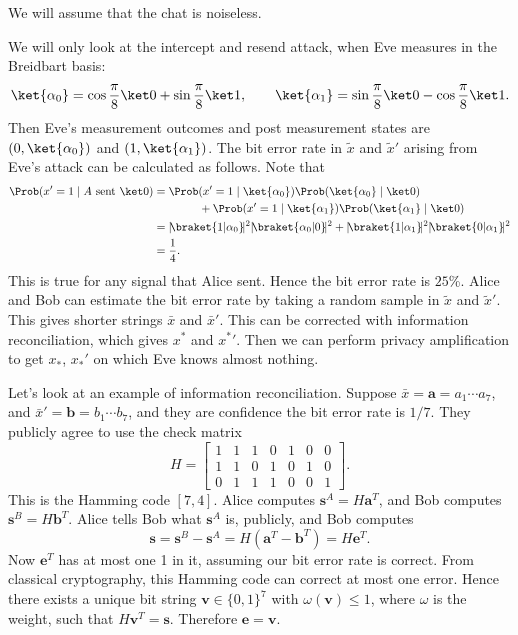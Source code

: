 \documentclass[12pt]{article}
\begin{document}
We will assume that the chat is noiseless.


We will only look at the intercept and resend attack, when Eve measures in the Breidbart basis:
\[
	\ket {\alpha_0} = \cos \frac{\pi}{8} \ket 0 + \sin \frac{\pi}{8} \ket 1, \qquad \ket {\alpha_1} = \sin \frac{\pi}{8} \ket 0 - \cos \frac{\pi}{8} \ket 1.
\]
Then Eve's measurement outcomes and post measurement states are $(0, \ket{\alpha_0})$ and $(1, \ket{\alpha_1})$. The bit error rate in $\tilde x$ and ${\tilde x}'$ arising from Eve's attack can be calculated as follows. Note that
\begin{align*}
	\Prob(x' = 1 \mid A \text{ sent } \ket 0) &= \Prob(x' = 1 \mid \ket{\alpha_0}) \Prob(\ket{\alpha_0}\mid \ket 0) \\
						  & \qquad \qquad + \Prob(x' = 1 \mid \ket{\alpha_1}) \Prob(\ket{\alpha_1} \mid \ket 0) \\
						  &= |\!\braket{1|\alpha_0}\!|^2|\!\braket{\alpha_0|0}\!|^2 + |\!\braket{1|\alpha_1}\!|^2|\!\braket{0|\alpha_1}\!|^2 \\
						  &= \frac{1}{4}.
\end{align*}
This is true for any signal that Alice sent. Hence the bit error rate is $25$\%. Alice and Bob can estimate the bit error rate by taking a random sample in $\tilde x$ and ${\tilde x}'$. This gives shorter strings $\bar x$ and ${\bar x}'$. This can be corrected with information reconciliation, which gives $x^\ast$ and ${x^\ast}'$. Then we can perform privacy amplification to get $x_\ast$, $x_\ast'$ on which Eve knows almost nothing.

Let's look at an example of information reconciliation. Suppose $\bar x = \mathbf{a} = a_1 \cdots a_7$, and ${\bar x}' = \mathbf{b} = b_1 \cdots b_7$, and they are confidence the bit error rate is $1/7$. They publicly agree to use the check matrix
\[
H =
\begin{bmatrix}
	1 & 1 & 1 & 0 & 1 & 0 & 0 \\
	1 & 1 & 0 & 1 & 0 & 1 & 0 \\
	0 & 1 & 1 & 1 & 0 & 0 & 1
\end{bmatrix}.
\]
This is the Hamming code $[7, 4]$. Alice computes $\mathbf{s}^A = H \mathbf{a}^T$, and Bob computes $\mathbf{s}^B = H \mathbf{b}^T$. Alice tells Bob what $\mathbf{s}^A$ is, publicly, and Bob computes
\[
\mathbf{s} = \mathbf{s}^B - \mathbf{s}^A = H(\mathbf{a}^T - \mathbf{b}^T) = H \mathbf{e}^T.
\]
Now $\mathbf{e}^T$ has at most one 1 in it, assuming our bit error rate is correct. From classical cryptography, this Hamming code can correct at most one error. Hence there exists a unique bit string $\mathbf{v} \in \{0, 1\}^7$ with $\omega(\mathbf{v}) \leq 1$, where $\omega$ is the weight, such that $H \mathbf{v}^T = \mathbf{s}$. Therefore $\mathbf{e} = \mathbf{v}$.
\end{document}
